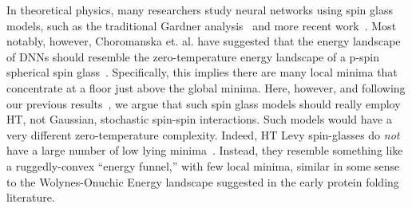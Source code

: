 In theoretical physics, many researchers study neural networks using spin glass models, such as the traditional Gardner analysis~\cite{GD89} and more recent work~\cite{PSG17_TR,PSG18_TR}.
Most notably, however, Choromanska et. al. have suggested that the energy landscape of DNNs should resemble the zero-temperature energy landscape of a p-spin spherical spin glass~\cite{CHMAx14_TR}.
Specifically, 
this implies 
there are many local minima that concentrate at a floor just above the global minima. 
Here, however, and following our previous results~\cite{MM18_TR,MM19_HTSR_ICML}, we argue that such spin glass models should really employ HT, not Gaussian, stochastic spin-spin interactions.
Such models would have a very different zero-temperature complexity. 
Indeed, HT Levy spin-glasses do \emph{not} have a large number of low lying minima~\cite{CB93,galluccio1998,GabKon99}.
Instead, they resemble something like a ruggedly-convex ``energy funnel,'' with few local minima, similar in some sense to the Wolynes-Onuchic Energy landscape \cite{wolynes_proteins_95,wolynes_arpc_97} suggested in the early protein folding literature.




